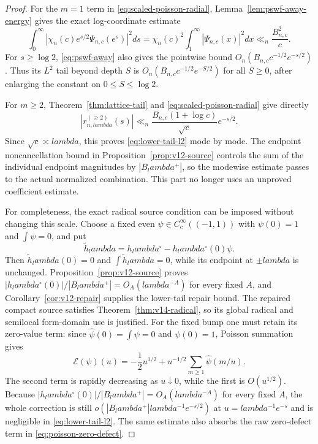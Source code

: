 \documentclass[11pt]{article}
\def\lambda{lambda}%
\theoremstyle{remark}
\begin{document}
\begin{proof}
For the $m=1$ term in \eqref{eq:scaled-poisson-radial}, Lemma~\ref{lem:pswf-away-energy} gives the exact log-coordinate estimate
\[
 \int_0^\infty
 \left|\chi_n(c)e^{s/2}\Psi_{n,c}(e^s)\right|^2ds
 =\chi_n(c)^2\int_1^\infty|\Psi_{n,c}(x)|^2dx
 \ll_n\frac{B_{n,c}^2}{c}.
\]
For $s\ge\log2$, \eqref{eq:pswf-away} also gives the pointwise bound
$O_n(B_{n,c}c^{-1/2}e^{-s/2})$.  Thus its $L^2$ tail beyond depth $S$ is
$O_n(B_{n,c}c^{-1/2}e^{-S/2})$ for all $S\ge0$, after enlarging the constant on $0\le S\le\log2$.

For $m\ge2$, Theorem~\ref{thm:lattice-tail} and \eqref{eq:scaled-poisson-radial} give directly
\[
 |r_{n,\lambda}^{(\ge2)}(s)|
 \ll_n \frac{B_{n,c}(1+\log c)}{\sqrt c}e^{-s/2}.
\]
Since $\sqrt c\asymp\lambda$, this proves \eqref{eq:lower-tail-l2} mode by mode. The endpoint noncancellation bound in Proposition~\ref{prop:v12-source} controls the sum of the individual endpoint magnitudes by $|B_\lambda^+|$, so the modewise estimate passes to the actual normalized combination. This part no longer uses an unproved coefficient estimate.

For completeness, the exact radical source condition can be imposed without changing this scale.  Choose a fixed even $\psi\in C_c^\infty((-1,1))$ with $\psi(0)=1$ and $\int\psi=0$, and put
\[
 \widetilde h_\lambda=h_\lambda^{\circ}-h_\lambda^{\circ}(0)\psi.
\]
Then $\widetilde h_\lambda(0)=0$ and $\int\widetilde h_\lambda=0$, while its endpoint at $\pm\lambda$ is unchanged. Proposition~\ref{prop:v12-source} proves
$|h_\lambda^\circ(0)|/|B_\lambda^+|=O_A(\lambda^{-A})$ for every fixed $A$,
and Corollary~\ref{cor:v12-repair} supplies the lower-tail repair bound.
The repaired compact source satisfies Theorem~\ref{thm:v14-radical},
so its global radical and semilocal form-domain use is justified.
For the fixed bump one must retain its zero-value term: since $\widehat\psi(0)=\int\psi=0$ and $\psi(0)=1$, Poisson summation gives
\[
 \mathcal E(\psi)(u)
 =-\frac12u^{1/2}
   +u^{-1/2}\sum_{m\ge1}\widehat\psi(m/u).
\]
The second term is rapidly decreasing as $u\downarrow0$, while the first is $O(u^{1/2})$.  Because $|h_\lambda^{\circ}(0)|/|B_\lambda^{+}|=O_A(\lambda^{-A})$ for every fixed $A$, the whole correction is still $o(|B_\lambda^{+}|\lambda^{-1}e^{-s/2})$ at $u=\lambda^{-1}e^{-s}$ and is negligible in \eqref{eq:lower-tail-l2}.  The same estimate also absorbs the raw zero-defect term in \eqref{eq:poisson-zero-defect}.


\end{proof}
\end{document}
